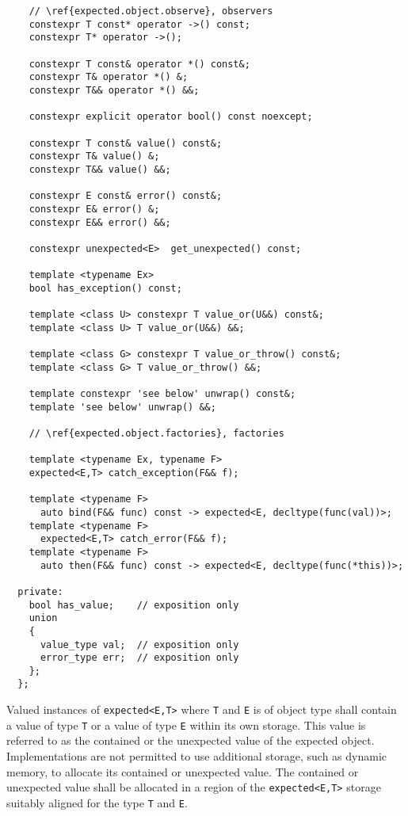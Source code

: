 \documentclass[a4paper,10pt]{article}
\newcommand{\cpp}[1]{\lstinline{#1}}
\begin{document}
\begin{lstlisting}
    // \ref{expected.object.observe}, observers
    constexpr T const* operator ->() const;
    constexpr T* operator ->();
    
    constexpr T const& operator *() const&;
    constexpr T& operator *() &;
    constexpr T&& operator *() &&;
    
    constexpr explicit operator bool() const noexcept;
    
    constexpr T const& value() const&;
    constexpr T& value() &;
    constexpr T&& value() &&;
    
    constexpr E const& error() const&;
    constexpr E& error() &;
    constexpr E&& error() &&;
    
    constexpr unexpected<E>  get_unexpected() const;
    
    template <typename Ex>
    bool has_exception() const;
      
    template <class U> constexpr T value_or(U&&) const&;
    template <class U> T value_or(U&&) &&;
    
    template <class G> constexpr T value_or_throw() const&;
    template <class G> T value_or_throw() &&;

    template constexpr 'see below' unwrap() const&;
    template 'see below' unwrap() &&;

    // \ref{expected.object.factories}, factories

    template <typename Ex, typename F>
    expected<E,T> catch_exception(F&& f);

    template <typename F>
      auto bind(F&& func) const -> expected<E, decltype(func(val))>;
    template <typename F>
      expected<E,T> catch_error(F&& f);
    template <typename F>
      auto then(F&& func) const -> expected<E, decltype(func(*this))>;
  
  private:
    bool has_value;    // exposition only
    union
    {
      value_type val;  // exposition only
      error_type err;  // exposition only
    };
  };

\end{lstlisting}


Valued instances of \cpp{expected<E,T>} where \cpp{T} and \cpp{E} is of object type shall contain a value of type \cpp{T} or a value of type \cpp{E} within its own storage. This value is referred to as the contained or the unexpected value of the expected object. Implementations are not permitted to use additional storage, such as dynamic memory, to allocate its contained or unexpected value. The contained or unexpected value shall be allocated in a region of the \cpp{expected<E,T>} storage suitably aligned for the type \cpp{T} and \cpp{E}.
\newline
\end{document}
